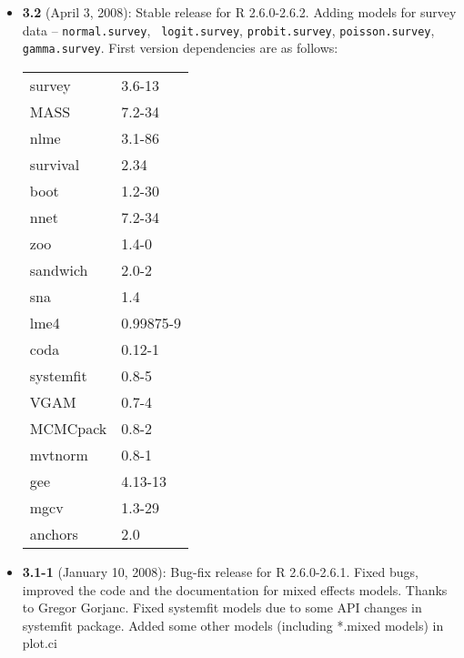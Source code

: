 \begin{itemize}
\item {\bf 3.2} (April 3, 2008): Stable release for R 2.6.0-2.6.2.
  Adding models for survey data -- {\tt normal.survey}, {\tt
    logit.survey}, {\tt probit.survey}, {\tt poisson.survey}, {\tt
    gamma.survey}.  First version dependencies are as
  follows:\newline
\begin{tabular}{ll}\label{table.compat}
survey    & 3.6-13 \\
MASS      & 7.2-34 \\
nlme      & 3.1-86 \\
survival  & 2.34 \\
boot      & 1.2-30 \\
nnet      & 7.2-34 \\
zoo       & 1.4-0 \\
sandwich  & 2.0-2 \\
sna       & 1.4 \\
lme4      & 0.99875-9 \\
coda      & 0.12-1 \\
systemfit & 0.8-5 \\
VGAM      & 0.7-4 \\
MCMCpack  & 0.8-2 \\
mvtnorm   & 0.8-1 \\
gee       & 4.13-13 \\
mgcv      & 1.3-29 \\
anchors   & 2.0 
\end{tabular}

\item {\bf 3.1-1} (January 10, 2008): Bug-fix release for R
  2.6.0-2.6.1. Fixed bugs, improved the code and the documentation for
  mixed effects models. Thanks to Gregor Gorjanc. Fixed systemfit models 
  due to some API changes in systemfit package. Added some other models (including *.mixed models) in  plot.ci 


\end{itemize}
